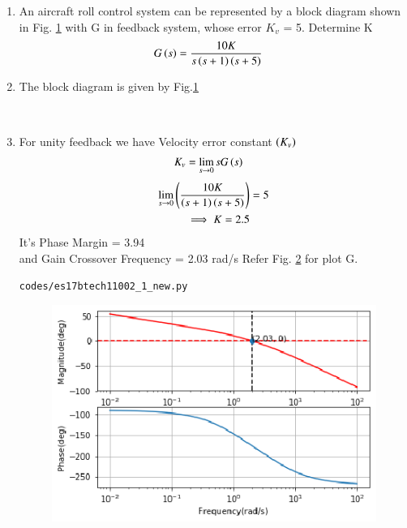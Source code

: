 \begin{enumerate}[label=\thesection.\arabic*.,ref=\thesection.\theenumi]
\item An aircraft roll control system can be represented by a block diagram shown in Fig. \ref{fig:es17btech11002_block} with G in feedback system, whose error  $K_v$ = 5. Determine K 
\begin{align}
G\brak{s} &= \frac{10K}{s\brak{s+1}\brak{s+5}}
\label{eq:es17btech11002_system}
\end{align}
\item The block diagram is given by Fig.\ref{fig:es17btech11002_block}
\begin{figure}[!ht]
 \centering
     \resizebox{\columnwidth}{!}{}
    \caption{}
    \label{fig:es17btech11002_block}
\end{figure}
\\

\item \solution For unity feedback we have Velocity error constant $\left(K_v\right)$
\begin{align}
K_v &= \lim_{s \to 0} s G\left(s\right) 
\end{align}
\begin{align}
\lim_{s \to 0} \left(\frac{10K}{\left(s+1\right)\left(s+5\right)} \right)& = 5 \\
\implies K = 2.5
\end{align}
It's Phase Margin  = 3.94\degree\\
and Gain Crossover Frequency = 2.03 rad/s
Refer Fig. \ref{fig:es17btech11002_1} for plot G.
\begin{lstlisting}
codes/es17btech11002_1_new.py
\end{lstlisting}
\begin{figure}[!h]
\centering
  \includegraphics[width=\columnwidth]{./figs/es17btech11002_1_new.eps}
  \caption{}
  \label{fig:es17btech11002_1}
\end{figure}


\end{enumerate}
